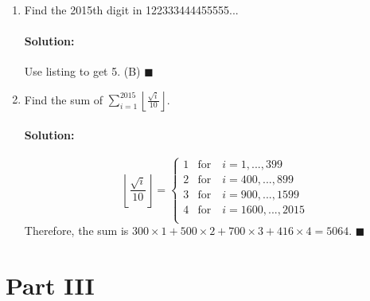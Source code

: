 \documentclass{article}
\newcommand{\floor}[1]{\ensuremath{\left\lfloor #1\right\rfloor}}
\newenvironment{solution}{\paragraph{Solution:}}{\hfill$\blacksquare$}
\begin{document}
\begin{enumerate}
	\item Find the 2015th digit in 122333444455555...
	
	\begin{solution}
		Use listing to get 5. (B)
	\end{solution}
	
	\item Find the sum of $\displaystyle \sum_{i=1}^{2015}\left\lfloor \frac{\sqrt{i}}{10}\right\rfloor$.
	
	\begin{solution}
		\begin{equation}
		\floor{\frac{\sqrt{i}}{10}} =
			\begin{cases}
			 1 & \text{for}\quad i=1,..., 399\\
			 2 & \text{for}\quad i=400,..., 899\\
			 3 & \text{for}\quad i=900,..., 1599\\
			 4 & \text{for}\quad i=1600,..., 2015\\
			\end{cases}
		\end{equation}
		Therefore, the sum is $300\times 1+ 500\times 2+700\times3 + 416\times 4=5064$.
	\end{solution}
	\end{enumerate}

\section*{Part III}
\end{document}
